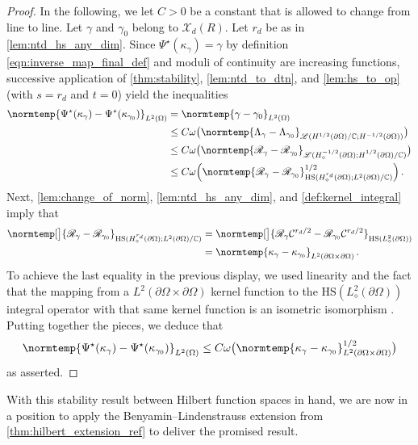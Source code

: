 \documentclass[pdflatex,sn-mathphys-num]{sn-jnl-preprint}
\let\originalleft\left %
\let\originalright\right
\renewcommand{\left}{\mathopen{}\mathclose\bgroup\originalleft}
\renewcommand{\right}{\aftergroup\egroup\originalright}
\newcommand{\C}{\mathbb{C}}
\newcommand{\cX}{\mathcal{X}}
\newcommand{\cC}{\mathcal{C}}
\newcommand{\sL}{\mathscr{L}}
\newcommand{\pOmega}{{\partial\Omega}}
\newcommand{\dtn}{\Lambda_{\gamma}}
\newcommand{\dtnz}{\Lambda_{\gamma_0}}
\newcommand{\ntd}{\mathscr{R}_{\gamma}}
\newcommand{\ntdz}{\mathscr{R}_{\gamma_0}}
\newcommand{\norm}{\normtemp}
\newcommand{\HS}{\mathrm{HS}} %
\theoremstyle{thmstyleone}%
\theoremstyle{thmstyletwo}%
\theoremstyle{thmstylethree}%
\numberwithin{equation}{section}
\numberwithin{theorem}{section}
\begin{document}
\begin{proof}
    In the following, we let $C>0$ be a constant that is allowed to change from line to line. Let $\gamma$ and $\gamma_0$ belong to $\cX_d(R)$. Let $r_d$ be as in \cref{lem:ntd_hs_any_dim}. Since $\Psi^\star(\kappa_\gamma)=\gamma$ by definition \eqref{eqn:inverse_map_final_def} and moduli of continuity are increasing functions, successive application of \cref{thm:stability}, \cref{lem:ntd_to_dtn}, and \cref{lem:hs_to_op} (with $s=r_d$ and $t=0$) yield the inequalities
    \begin{align*}
        \norm{\Psi^\star(\kappa_\gamma)-\Psi^\star(\kappa_{\gamma_0})}_{L^2(\Omega)}&=\norm{\gamma-\gamma_0}_{L^2(\Omega)}\\
        &\leq C\omega\bigl(\norm{\dtn-\dtnz}_{\sL(H^{1/2}(\pOmega)/\C;H^{-1/2}(\pOmega))}\bigr)\\
        &\leq C\omega\bigl(\norm{\ntd-\ntdz}_{\sL(H^{-1/2}_\diamond(\pOmega);H_{\phantom{\diamond}}^{1/2}(\pOmega)/\C)}\bigr)\\
        &\leq C \omega\left(\norm{\ntd-\ntdz}^{1/2}_{\HS(H^{r_d}_\diamond(\pOmega);L^2(\pOmega)/\C)}\right)\,.
    \end{align*}
    Next, \cref{lem:change_of_norm}, \cref{lem:ntd_hs_any_dim}, and \cref{def:kernel_integral} imply that
    \begin{align*}
        \norm[\big]{\ntd-\ntdz}_{\HS(H^{r_d}_\diamond(\pOmega);L^2(\pOmega)/\C)}&=\norm[\big]{\ntd\cC^{r_d/2}-\ntdz\cC^{r_d/2}}_{\HS(L^2_\diamond(\pOmega))}\\
        &=\norm{\kappa_\gamma-\kappa_{\gamma_0}}_{L^2(\pOmega\times\pOmega)}\,.
    \end{align*}
    To achieve the last equality in the previous display, we used linearity and the fact that the mapping from a $L^2(\partial\Omega\times \partial\Omega)$ kernel function to the $\HS(L^2_\diamond(\partial\Omega)) $ integral operator with that same kernel function is an isometric isomorphism \cite[Prop.~2.8.6, p.~74]{arveson2002short}. Putting together the pieces, we deduce that
    \begin{align*}
        \norm{\Psi^\star(\kappa_\gamma)-\Psi^\star(\kappa_{\gamma_0})}_{L^2(\Omega)}\leq C\omega\bigl(\norm{\kappa_\gamma-\kappa_{\gamma_0}}_{L^2(\pOmega\times\pOmega)}^{1/2}\bigr)
    \end{align*}
    as asserted.
\end{proof}

With this stability result between Hilbert function spaces in hand, we are now in a position to apply the Benyamin--Lindenstrauss extension from \cref{thm:hilbert_extension_ref} to deliver the promised result. 
\end{document}
